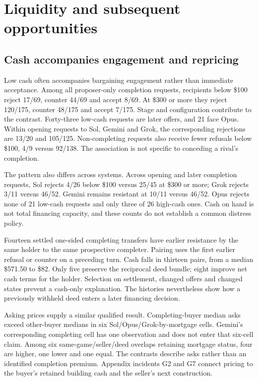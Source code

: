 \section{Liquidity and subsequent opportunities}
\subsection{Cash accompanies engagement and repricing}
Low cash often accompanies bargaining engagement rather than immediate acceptance. Among all proposer-only completion requests, recipients below \$100 reject 17/69, counter 44/69 and accept 8/69. At \$300 or more they reject 120/175, counter 48/175 and accept 7/175. Stage and configuration contribute to the contrast. Forty-three low-cash requests are later offers, and 21 face Opus. Within opening requests to Sol, Gemini and Grok, the corresponding rejections are 13/20 and 105/125. Non-completing requests also receive fewer refusals below \$100, 4/9 versus 92/138. The association is not specific to conceding a rival's completion.

The pattern also differs across systems. Across opening and later completion requests, Sol rejects 4/26 below \$100 versus 25/45 at \$300 or more; Grok rejects 3/11 versus 46/52. Gemini remains resistant at 10/11 versus 46/52. Opus rejects none of 21 low-cash requests and only three of 26 high-cash ones. Cash on hand is not total financing capacity, and these counts do not establish a common distress policy.

Fourteen settled one-sided completing transfers have earlier resistance by the same holder to the same prospective completer. Pairing uses the first earlier refusal or counter on a preceding turn. Cash falls in thirteen pairs, from a median \$571.50 to \$82. Only five preserve the reciprocal deed bundle; eight improve net cash terms for the holder. Selection on settlement, changed offers and changed states prevent a cash-only explanation. The histories nevertheless show how a previously withheld deed enters a later financing decision.

Asking prices supply a similar qualified result. Completing-buyer median asks exceed other-buyer medians in six Sol/Opus/Grok-by-mortgage cells. Gemini's corresponding completing cell has one observation and does not enter that six-cell claim. Among six same-game/seller/deed overlaps retaining mortgage status, four are higher, one lower and one equal. The contrasts describe asks rather than an identified completion premium. Appendix incidents G2 and G7 connect pricing to the buyer's retained building cash and the seller's next construction.

